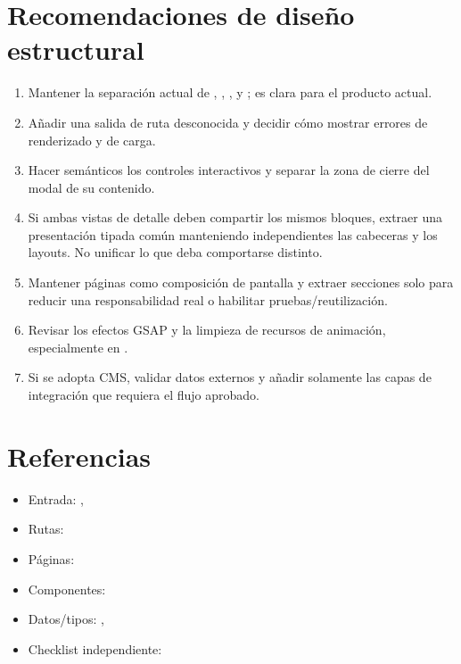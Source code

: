 \documentclass[11pt,a4paper]{report}
\begin{document}
\chapter{Recomendaciones de diseño estructural}

\begin{enumerate}
  \item Mantener la separación actual de , , ,  y ; es clara para el producto actual.
  \item Añadir una salida de ruta desconocida y decidir cómo mostrar errores de renderizado y de carga.
  \item Hacer semánticos los controles interactivos y separar la zona de cierre del modal de su contenido.
  \item Si ambas vistas de detalle deben compartir los mismos bloques, extraer una presentación tipada común manteniendo independientes las cabeceras y los layouts. No unificar lo que deba comportarse distinto.
  \item Mantener páginas como composición de pantalla y extraer secciones solo para reducir una responsabilidad real o habilitar pruebas/reutilización.
  \item Revisar los efectos GSAP y la limpieza de recursos de animación, especialmente en .
  \item Si se adopta CMS, validar datos externos y añadir solamente las capas de integración que requiera el flujo aprobado.
\end{enumerate}

\chapter{Referencias}

\begin{itemize}
  \item Entrada: , 
  \item Rutas: 
  \item Páginas: 
  \item Componentes: 
  \item Datos/tipos: , 
  \item Checklist independiente: 
\end{itemize}
\end{document}
